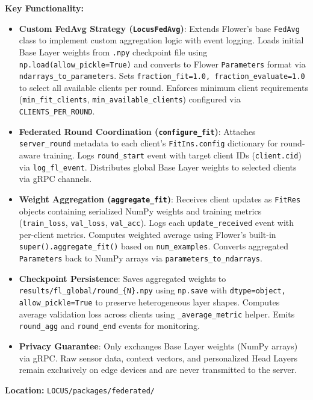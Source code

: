 \documentclass[conference]{IEEEtran}
\begin{document}
\textbf{Key Functionality:}
\begin{itemize}
    \item \textbf{Custom FedAvg Strategy (\texttt{LocusFedAvg})}: Extends Flower's base \texttt{FedAvg} class to implement custom aggregation logic with event logging. Loads initial Base Layer weights from \texttt{.npy} checkpoint file using \texttt{np.load(allow\_pickle=True)} and converts to Flower \texttt{Parameters} format via \texttt{ndarrays\_to\_parameters}. Sets \texttt{fraction\_fit=1.0, fraction\_evaluate=1.0} to select all available clients per round. Enforces minimum client requirements (\texttt{min\_fit\_clients}, \texttt{min\_available\_clients}) configured via \texttt{CLIENTS\_PER\_ROUND}.
    \item \textbf{Federated Round Coordination (\texttt{configure\_fit})}: Attaches \texttt{server\_round} metadata to each client's \texttt{FitIns.config} dictionary for round-aware training. Logs \texttt{round\_start} event with target client IDs (\texttt{client.cid}) via \texttt{log\_fl\_event}. Distributes global Base Layer weights to selected clients via gRPC channels.
    \item \textbf{Weight Aggregation (\texttt{aggregate\_fit})}: Receives client updates as \texttt{FitRes} objects containing serialized NumPy weights and training metrics (\texttt{train\_loss}, \texttt{val\_loss}, \texttt{val\_acc}). Logs each \texttt{update\_received} event with per-client metrics. Computes weighted average using Flower's built-in \texttt{super().aggregate\_fit()} based on \texttt{num\_examples}. Converts aggregated \texttt{Parameters} back to NumPy arrays via \texttt{parameters\_to\_ndarrays}.
    \item \textbf{Checkpoint Persistence}: Saves aggregated weights to \texttt{results/fl\_global/round\_\{N\}.npy} using \texttt{np.save} with \texttt{dtype=object, allow\_pickle=True} to preserve heterogeneous layer shapes. Computes average validation loss across clients using \texttt{\_average\_metric} helper. Emits \texttt{round\_agg} and \texttt{round\_end} events for monitoring.
    \item \textbf{Privacy Guarantee}: Only exchanges Base Layer weights (NumPy arrays) via gRPC. Raw sensor data, context vectors, and personalized Head Layers remain exclusively on edge devices and are never transmitted to the server.
\end{itemize}

\textbf{Location:} \texttt{LOCUS/packages/federated/}
\end{document}
